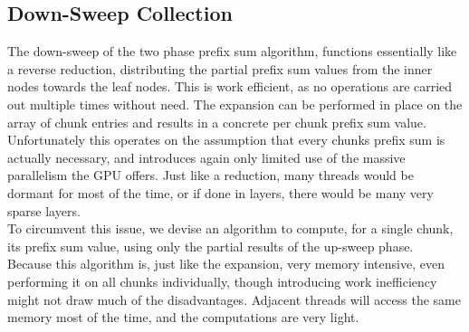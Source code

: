 \documentclass{tudscrreprt}
\begin{document}
			\subsection{Down-Sweep Collection}
				\label{sec:analysis_pss_down_sweep}
				The down-sweep of the two phase prefix sum algorithm, functions essentially like a reverse reduction, distributing the partial prefix sum values from the inner nodes towards the leaf nodes. This is work efficient, as no operations are carried out multiple times without need. The expansion can be performed in place on the array of chunk entries and results in a concrete per chunk prefix sum value. \\
				Unfortunately this operates on the assumption that every chunks prefix sum is actually necessary, and introduces again only limited use of the massive parallelism the GPU offers. Just like a reduction, many threads would be dormant for most of the time, or if done in layers, there would be many very sparse layers. \\
				
				To circumvent this issue, we devise an algorithm to compute, for a single chunk, its prefix sum value, using only the partial results of the up-sweep phase. \\
				Because this algorithm is, just like the expansion, very memory intensive, even performing it on all chunks individually, though introducing work inefficiency might not draw much of the disadvantages. Adjacent threads will access the same memory most of the time, and the computations are very light. \\
				
\end{document}
